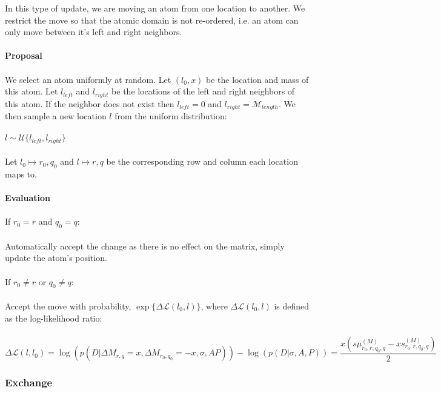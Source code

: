\documentclass[]{article}
\begin{document}
In this type of update, we are moving an atom from one location to another. We restrict the move so that the atomic domain is not re-ordered, i.e. an atom can only move between it's left and right neighbors.\\
\\
\textbf{Proposal}\\
\\
We select an atom uniformly at random. Let $(l_0,x)$ be the location and mass of this atom. Let $l_{left}$ and $l_{right}$ be the locations of the left and right neighbors of this atom. If the neighbor does not exist then $l_{left} = 0$ and $l_{right} = \mathcal{M}_{length}$. We then sample a new location $l$ from the uniform distribution:\\
\\
$l \sim \mathcal{U}\{l_{left}, l_{right}\}$\\
\\
Let $l_0 \mapsto r_0, q_0$ and $l \mapsto r, q$ be the corresponding row and column each location maps to.\\
\\
\textbf{Evaluation}\\
\\
If $r_0 = r$ and $q_0 = q$:\\
\\
Automatically accept the change as there is no effect on the matrix, simply update the atom's position.\\
\\
If $r_0 \neq r$ or $q_0 \neq q$:\\
\\
Accept the move with probability, $\exp\{\Delta\mathcal{L}(l_0, l)\}$, where $\Delta\mathcal{L}(l_0, l)$ is defined as the log-likelihood ratio:\\
\\
$\Delta\mathcal{L}(l, l_0) = \log(p(D|\Delta M_{r,q} = x, \Delta M_{r_0, q_0} = -x,\sigma,AP)) - \log(p(D|\sigma,A,P)) = \dfrac{x(s\mu_{r_0,r,q_0,q}^{(M)} - xs_{r_0,r,q_0,q}^{(M)})}{2}$\\

\subsubsection{Exchange}
\end{document}
